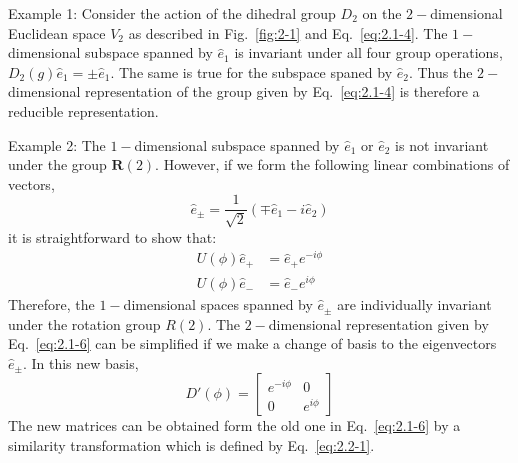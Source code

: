 \textrm{Example 1}: Consider the action of the dihedral group $D_2$ on the $2-$dimensional Euclidean space $V_2$ as described in Fig.~\ref{fig:2-1} and Eq.~\eqref{eq:2.1-4}.
The $1-$dimensional subspace spanned by $\hat{e}_1$ is invariant under all four group operations, $D_2 \left( g \right) \hat{e}_1 = \pm \hat{e}_1$.
The same is true for the subspace spaned by $\hat{e}_2$.
Thus the $2-$dimensional representation of the group given by Eq.~\eqref{eq:2.1-4} is therefore a reducible representation.

\textrm{Example 2}: The $1-$dimensional subspace spanned by $\hat{e}_{1}$ or $\hat{e}_2$ is not invariant under the group $\mathbf{R} \left( 2 \right)$.
However, if we form the following linear combinations of vectors,
\begin{equation}
  \label{eq:2.2-1}
 \hat{e}_{\pm} = \frac{1}{\sqrt{2}} \left( \mp \hat{e}_1 - i \hat{e}_2 \right)
\end{equation}
it is straightforward to show that:
\begin{align}
  \label{eq:2.2-2}
  U \left( \phi \right) \hat{e}_+ &= \hat{e}_+ e^{-i\phi} \\ \nonumber
  U \left( \phi \right) \hat{e}_- &= \hat{e}_- e^{i\phi}
\end{align}
Therefore, the $1-$dimensional spaces spanned by $\hat{e}_{\pm}$ are individually invariant under the rotation group $R \left( 2 \right)$.
The $2-$dimensional representation given by Eq.~\eqref{eq:2.1-6} can be simplified if we make a change of basis to the eigenvectors $\hat{e}_{\pm}$.
In this new basis,
\begin{equation}
  \label{eq:2.2-3}
  D' \left( \phi \right) =
  \begin{bmatrix}
    e^{-i\phi} & 0 \\
    0 & e^{i\phi}
  \end{bmatrix}
\end{equation}
The new matrices can be obtained form the old one in Eq.~\eqref{eq:2.1-6} by a similarity transformation which is defined by Eq.~\eqref{eq:2.2-1}.

